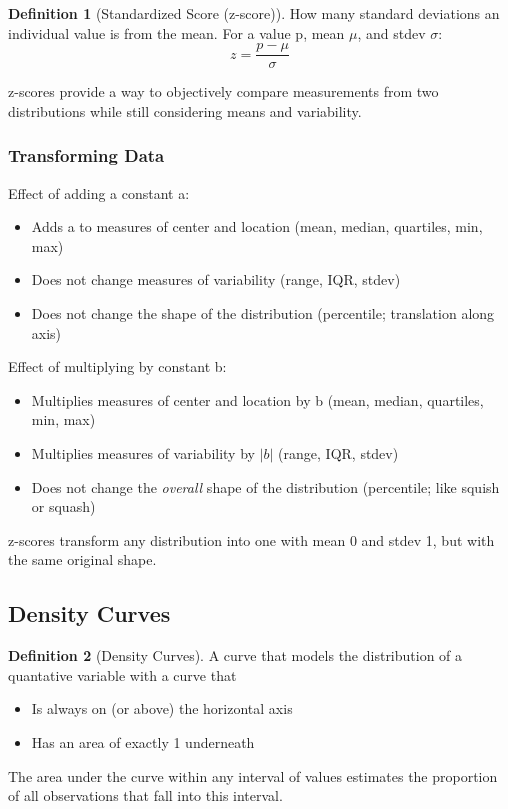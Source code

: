 \documentclass[12pt, a4paper]{article}
\theoremstyle{definition}
\newtheorem{definition}{Definition}
\begin{document}
\begin{definition}[Standardized Score (z-score)]
    How many standard deviations an individual value is from the mean. For a value p, mean $\mu$, and stdev $\sigma$:
    \[z = \frac{p - \mu}{\sigma}\]
\end{definition}

z-scores provide a way to objectively compare measurements from two distributions while still considering means and variability.

\subsubsection{Transforming Data}

Effect of adding a constant a:
\begin{itemize}
    \item Adds a to measures of center and location (mean, median, quartiles, min, max)
    \item Does not change measures of variability (range, IQR, stdev)
    \item Does not change the shape of the distribution (percentile; translation along axis)
\end{itemize}

Effect of multiplying by constant b:
\begin{itemize}
    \item Multiplies measures of center and location by b (mean, median, quartiles, min, max)
    \item Multiplies measures of variability by $|b|$ (range, IQR, stdev)
    \item Does not change the \textit{overall} shape of the distribution (percentile; like squish or squash)
\end{itemize}

z-scores transform any distribution into one with mean 0 and stdev 1, but with the same original shape.

\subsection{Density Curves}
\begin{definition}[Density Curves]
    A curve that models the distribution of a quantative variable with a curve that
    \begin{itemize}
        \item Is always on (or above) the horizontal axis
        \item Has an area of exactly 1 underneath
    \end{itemize}
    The area under the curve within any interval of values estimates the proportion of all observations that fall into this interval.
\end{definition}
\end{document}
